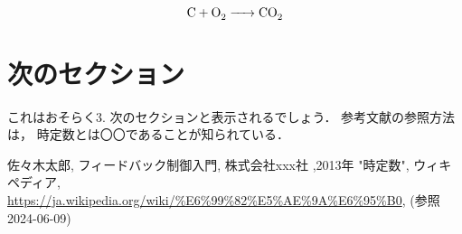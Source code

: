 \documentclass[uplatex,a4paper,11pt]{jsarticle} %
\numberwithin{equation}{section}     %
\begin{document}
\begin{equation}
    \ce{C + O2 -> CO2}
\end{equation}

\section{次のセクション}
これはおそらく3. 次のセクションと表示されるでしょう．
参考文献の参照方法は，
時定数とは〇〇であることが知られている\cite{jiteisu2024}．


\vspace{10mm}
\begin{thebibliography}{9}
     佐々木太郎, \quad フィードバック制御入門, \quad 株式会社xxx社 ,\quad 2013年
     "時定数", ウィキペディア, \quad \url{https://ja.wikipedia.org/wiki/%E6%99%82%E5%AE%9A%E6%95%B0}, \quad (参照 2024-06-09)
\end{thebibliography}


% 
\end{document}
